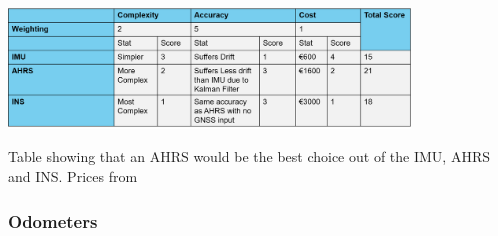\documentclass[11pt]{article}		%
\newcommand{\supercite}[1]{\textsuperscript{\cite{#1}}}		%
\begin{document}
            
            
            
            \begin{table}[h]
					\centering
					\includegraphics[width=0.8\textwidth]{IMU_formatted_table}
					\caption{Table showing that an AHRS would be the best choice out of the IMU, AHRS and INS. Prices from \cite{Ellipse_Ahrs}}
					\label{AHRS_comparison}
				\end{table}
				
			
				
				
        \subsubsection{Odometers}
                
\end{document}
